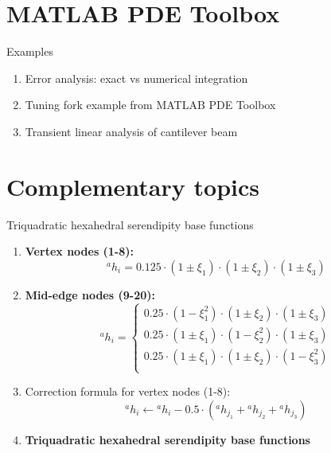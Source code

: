 \documentclass[aspectratio=169]{beamer}
\begin{document}
\section{MATLAB PDE Toolbox}

\begin{frame}{Examples}
    \begin{enumerate}
        \item Error analysis: exact vs numerical integration
        \item Tuning fork example from MATLAB PDE Toolbox
        \item Transient linear analysis of cantilever beam
    \end{enumerate}
    \begin{center}
        \href{https://drive.mathworks.com/sharing/6a9792ef-d0a7-4aca-a1d0-8b1862b0ac3b}{}
    \end{center}
\end{frame}

\section{Complementary topics}


\begin{frame}{Triquadratic hexahedral serendipity base functions}
    \begin{enumerate}
        \item[1.] \textbf{Vertex nodes (1-8):}
              \vspace{-.2cm}
              \[
                  {}^ah_i = 0.125 \cdot (1 \pm \xi_1) \cdot (1 \pm \xi_2) \cdot (1 \pm \xi_3)
              \]
              \vspace{-.7cm}
        \item[2.] {\color{orange}\textbf{Mid-edge nodes (9-20):}}
              \vspace{-.2cm}
              \[
                  {}^ah_i =\begin{cases}
                      0.25 \cdot (1 - \xi_1^2) \cdot (1 \pm  \xi_2) \cdot (1 \pm  \xi_3) \\
                      0.25 \cdot (1 \pm \xi_1) \cdot (1 - \xi_2^2) \cdot (1 \pm  \xi_3)  \\
                      0.25 \cdot (1 \pm \xi_1) \cdot (1 \pm  \xi_2) \cdot (1 -  \xi_3^2) \\
                  \end{cases}
              \]
              \vspace{-.5cm}
        \item[3.] Correction formula for vertex nodes (1-8):
              \vspace{-.2cm}
              \[
                  {}^ah_i \leftarrow {}^ah_i - 0.5 \cdot ({}^ah_{j_1} + {}^ah_{j_2}+{}^ah_{j_3})
              \]
              \vspace{-.7cm}
        \item[$\rightarrow$] \textbf{Triquadratic hexahedral serendipity base functions}
    \end{enumerate}
\end{frame}
\end{document}
